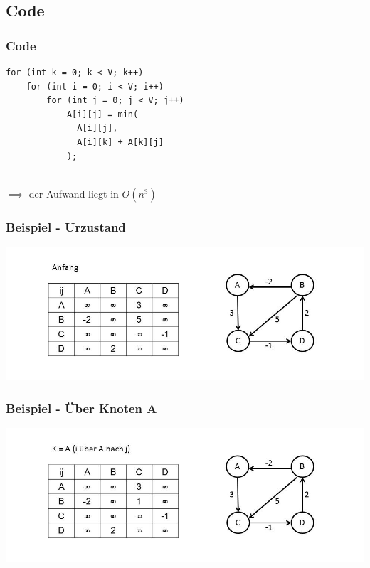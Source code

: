 
\subsection{Code}

\begin{frame}[fragile] %
\frametitle{Code}

\begin{lstlisting}
for (int k = 0; k < V; k++)
    for (int i = 0; i < V; i++)
        for (int j = 0; j < V; j++)
            A[i][j] = min(
              A[i][j],
              A[i][k] + A[k][j]
            );
\end{lstlisting}

~\\$\implies$ der Aufwand liegt in $O(n^3)$

\end{frame}


\begin{frame}
\frametitle{Beispiel - Urzustand}

\includegraphics[width=\linewidth]{floyd_warshall_graphs/graph1.JPG}

\end{frame}


\begin{frame}
\frametitle{Beispiel - Über Knoten A}

\includegraphics[width=\linewidth]{floyd_warshall_graphs/graph2.JPG}

\end{frame}

